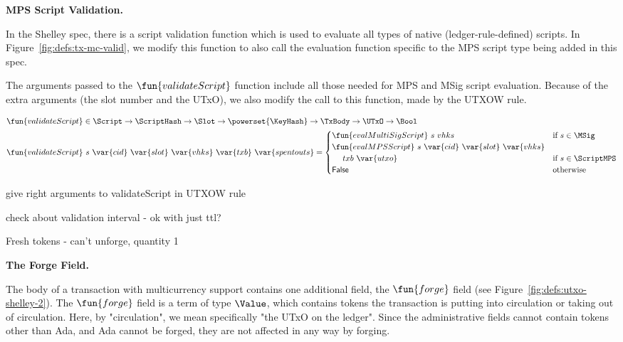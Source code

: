 \textbf{MPS Script Validation.}

In the Shelley spec, there is a script validation function which
is used to evaluate all types of native (ledger-rule-defined) scripts.
In Figure~\ref{fig:defs:tx-mc-valid}, we modify this function to also call the
evaluation function specific to the MPS script type being added in this spec.

The arguments passed to the $\fun{validateScript}$ function include all those
needed for MPS and MSig script evaluation. Because of the extra arguments
(the slot number and the UTxO), we also modify the call to this function, made
by the UTXOW rule.

\begin{figure*}[htb]
    \begin{align*}
      \fun{validateScript} & \in\Script\to\ScriptHash\to\Slot\to
      \powerset{\KeyHash}\to\TxBody\to\UTxO\to\Bool \\
      \fun{validateScript} & ~s~\var{cid}~\var{slot}~\var{vhks}
       ~\var{txb}~\var{spentouts} =
                             \begin{cases}
                               \fun{evalMultiSigScript}~s~vhks & \text{if}~s \in\MSig \\
                               \fun{evalMPSScript}~s~\var{cid}~\var{slot}~\var{vhks} \\
                                ~~~~txb~\var{utxo} & \text{if}~s \in\ScriptMPS \\
                               \mathsf{False} & \text{otherwise}
                             \end{cases} \\
    \end{align*}
  \caption{Script Validation}
  \label{fig:defs:tx-mc-valid}
\end{figure*}

\begin{note}
  give right arguments to validateScript in UTXOW rule

  check about validation interval - ok with just ttl?

  Fresh tokens - can’t unforge, quantity 1
\end{note}

\textbf{The Forge Field.}

The body of a transaction with multicurrency support contains one additional
field, the $\fun{forge}$ field (see Figure~\ref{fig:defs:utxo-shelley-2}).
The $\fun{forge}$ field is a term of type $\Value$, which contains
tokens the transaction is putting into circulation or taking out of
circulation. Here, by "circulation", we mean specifically "the UTxO on the
ledger". Since the administrative fields cannot contain tokens other than Ada,
and Ada cannot be forged, they are not affected in any way by forging.

